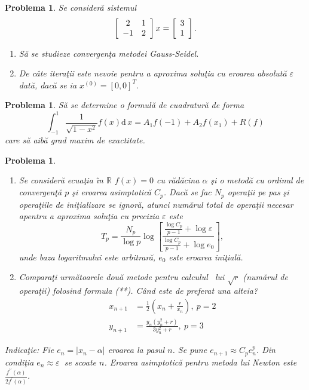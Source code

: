 \documentclass{article}%
\newtheorem{problem}[theorem]{Problema}
\begin{document}
\begin{problem}
Se consider\u{a} sistemul%
\[
\left[
\begin{array}
[c]{cc}%
2 & 1\\
-1 & 2
\end{array}
\right]  x=\left[
\begin{array}
[c]{c}%
3\\
1
\end{array}
\right]  .
\]


\begin{enumerate}
\item S\u{a} se studieze convergen\c{t}a metodei Gauss-Seidel.

\item De c\^{a}te itera\c{t}ii este nevoie pentru a aproxima solu\c{t}ia cu
eroarea absolut\u{a} $\varepsilon$ dat\u{a}, dac\u{a} se ia $x^{(0)}%
=[0,0]^{T}.$
\end{enumerate}
\end{problem}

\begin{problem}
S\u{a} se determine o formul\u{a} de cuadratur\u{a} de forma
\[
\int_{-1}^{1}\frac{1}{\sqrt{1-x^{2}}}f(x)\mathrm{d}\,x=A_{1}f(-1)+A_{2}%
f(x_{1})+R(f)
\]
care s\u{a} aib\u{a} grad maxim de exactitate.
\end{problem}



\begin{problem}
\begin{enumerate}
\item Se consider\u{a} ecua\c{t}ia \^{\i}n $\mathbb{R}$ $f(x)=0$ cu
r\u{a}d\u{a}cina $\alpha$ \c{s}i o metod\u{a} cu ordinul de
convergen\c{t}\u{a} $p$ \c{s}i eroarea asimptotic\u{a} $C_{p}$. Dac\u{a} se
fac $N_{p}$ opera\c{t}ii pe pas \c{s}i opera\c{t}iile de ini\c{t}ializare se
ignor\u{a}, atunci num\u{a}rul total de opera\c{t}ii necesar apentru a
aproxima solu\c{t}ia cu precizia $\varepsilon$ este%
\begin{equation}
T_{p}=\frac{N_{p}}{\log p}\log\left[  \frac{\frac{\log C_{p}}{p-1}%
+\log\varepsilon}{\frac{\log C_{p}}{p-1}+\log e_{0}}\right]  , \tag{**}%
\end{equation}
unde baza logaritmului este arbitrar\u{a}, $e_{0}$ este eroarea ini\c{t}ial\u{a}.

\item Compara\c{t}i urm\u{a}toarele dou\u{a} metode pentru calculul \ lui
$\sqrt{r}$ (num\u{a}rul de opera\c{t}ii) folosind formula (**). C\^{a}nd este
de preferat una alteia?%
\begin{align*}
x_{n+1}  & =\frac{1}{2}\left(  x_{n}+\frac{r}{x_{n}}\right)  ,~p=2\\
y_{n+1}  & =\frac{y_{n}\left(  y_{n}^{2}+r\right)  }{3y_{n}^{2}+r},~p=3
\end{align*}

\end{enumerate}

\emph{Indica\c{t}ie}: Fie $e_{n}=|x_{n}-\alpha|$ eroarea la pasul $n$. Se pune
$e_{n+1}\approx C_{p}e_{n}^{p}$. Din condi\c{t}ia $e_{n}\approx\varepsilon$
$\ $se scoate $n$. Eroarea asimptotic\u{a} pentru metoda lui Newton este
$\frac{f^{\prime\prime}(\alpha)}{2f^{\prime}(\alpha)}$.
\end{problem}
\end{document}
